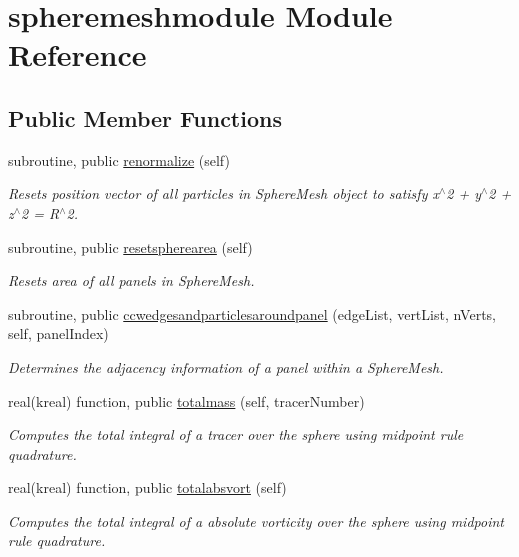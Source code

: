 \hypertarget{classspheremeshmodule}{\section{spheremeshmodule Module Reference}
\label{classspheremeshmodule}
}
\subsection*{Public Member Functions}
\begin{DoxyCompactItemize}
\item 
subroutine, public \hyperlink{group__SphereMesh_ga7e822ca8c1c2f3dbb84c1677b73b01d8}{renormalize} (self)
\begin{DoxyCompactList}\small\item\em Resets position vector of all particles in Sphere\+Mesh object to satisfy x$^\wedge$2 + y$^\wedge$2 + z$^\wedge$2 = R$^\wedge$2. \end{DoxyCompactList}\item 
subroutine, public \hyperlink{group__SphereMesh_ga8a8a47063a070aa34913a6ecffd90e62}{resetspherearea} (self)
\begin{DoxyCompactList}\small\item\em Resets area of all panels in Sphere\+Mesh. \end{DoxyCompactList}\item 
subroutine, public \hyperlink{group__SphereMesh_ga05c2ef27a6cef4f07bacbeae15d7a290}{ccwedgesandparticlesaroundpanel} (edge\+List, vert\+List, n\+Verts, self, panel\+Index)
\begin{DoxyCompactList}\small\item\em Determines the adjacency information of a panel within a Sphere\+Mesh. \end{DoxyCompactList}\item 
real(kreal) function, public \hyperlink{group__SphereMesh_gaff88fd47f20601b9ce1fc3b80f66c180}{totalmass} (self, tracer\+Number)
\begin{DoxyCompactList}\small\item\em Computes the total integral of a tracer over the sphere using midpoint rule quadrature. \end{DoxyCompactList}\item 
real(kreal) function, public \hyperlink{group__SphereMesh_ga73b1f415fd585597ed3d213632cbf8d9}{totalabsvort} (self)
\begin{DoxyCompactList}\small\item\em Computes the total integral of a absolute vorticity over the sphere using midpoint rule quadrature. \end{DoxyCompactList}\item 

\end{DoxyCompactItemize}
